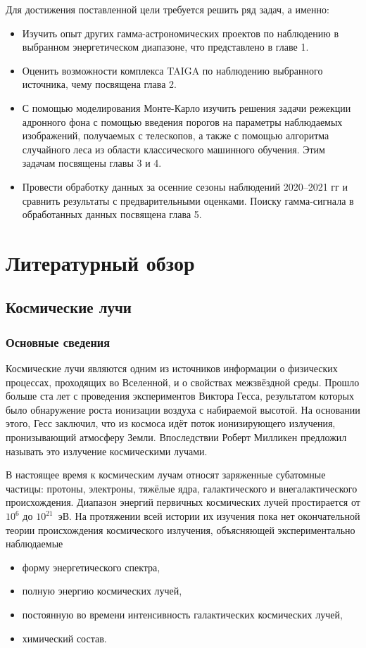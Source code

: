 \documentclass[magd,floatypics,numeref]{msudipl} %
\begin{document}
Для достижения поставленной цели требуется решить ряд задач, а именно:
\begin{itemize}
\item Изучить опыт других гамма-астрономических проектов по наблюдению в выбранном энергетическом диапазоне, что представлено в главе 1. 
\item Оценить возможности комплекса TAIGA  по наблюдению выбранного источника, чему посвящена глава 2. 
\item С помощью моделирования Монте-Карло изучить решения задачи режекции адронного фона с помощью введения порогов на параметры наблюдаемых изображений, получаемых с телескопов, а также с помощью алгоритма случайного леса из области классического машинного обучения. Этим задачам посвящены главы 3 и 4.
\item Провести обработку данных за осенние сезоны наблюдений 2020--2021 гг и сравнить результаты с предварительными оценками. Поиску гамма-сигнала в обработанных данных посвящена глава 5. 
\end{itemize}


\chapter{Литературный обзор}
\section{Космические лучи}
\subsection{Основные сведения}
Космические лучи являются одним из источников информации о физических процессах, проходящих во Вселенной, и о свойствах межзвёздной среды. Прошло больше ста лет с проведения экспериментов Виктора Гесса, результатом которых было обнаружение роста ионизации воздуха с набираемой высотой. На основании этого, Гесс заключил, что из космоса идёт поток ионизирующего излучения, пронизывающий атмосферу Земли. Впоследствии Роберт Милликен предложил называть это излучение космическими лучами.

В настоящее время к космическим лучам относят заряженные субатомные частицы: протоны, электроны, тяжёлые ядра, галактического и внегалактического происхождения. Диапазон энергий первичных космических лучей простирается от $10^6$ до $10^{21}$~эВ. На протяжении всей истории их изучения пока нет окончательной теории происхождения космического излучения, объясняющей экспериментально наблюдаемые
\begin{itemize}
\item форму энергетического спектра,
\item полную энергию космических лучей,
\item постоянную во времени интенсивность галактических космических лучей,
\item химический состав.
\end{itemize}
\end{document}
